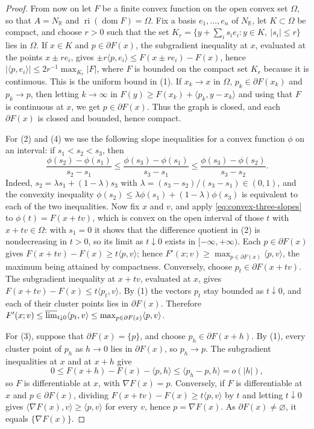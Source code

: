 \begin{proof}
From now on let $F$ be a finite convex function on the open convex set $\Omega$, so that $A=N_{\mathbb R}$ and $\operatorname{ri}(\operatorname{dom}F)=\Omega$. Fix a basis $e_1,\ldots,e_n$ of $N_{\mathbb R}$, let $K\subset\Omega$ be compact, and choose $r>0$ such that the set $K_r=\{y+\sum_is_ie_i:y\in K,\ |s_i|\leq r\}$ lies in $\Omega$. If $x\in K$ and $p\in\partial F(x)$, the subgradient inequality at $x$, evaluated at the points $x\pm re_i$, gives $\pm r\langle p,e_i\rangle\leq F(x\pm re_i)-F(x)$, hence $|\langle p,e_i\rangle|\leq2r^{-1}\max_{K_r}|F|$, where $F$ is bounded on the compact set $K_r$ because it is continuous. This is the uniform bound in (1). If $x_k\to x$ in $\Omega$, $p_k\in\partial F(x_k)$ and $p_k\to p$, then letting $k\to\infty$ in $F(y)\geq F(x_k)+\langle p_k,y-x_k\rangle$ and using that $F$ is continuous at $x$, we get $p\in\partial F(x)$. Thus the graph is closed, and each $\partial F(x)$ is closed and bounded, hence compact.

For (2) and (4) we use the following slope inequalities for a convex function $\phi$ on an interval: if $s_1<s_2<s_3$, then
\begin{equation}\label{eq:convex-three-slopes}
 \frac{\phi(s_2)-\phi(s_1)}{s_2-s_1}\leq\frac{\phi(s_3)-\phi(s_1)}{s_3-s_1}\leq\frac{\phi(s_3)-\phi(s_2)}{s_3-s_2}.
\end{equation}
Indeed, $s_2=\lambda s_1+(1-\lambda)s_3$ with $\lambda=(s_3-s_2)/(s_3-s_1)\in(0,1)$, and the convexity inequality $\phi(s_2)\leq\lambda\phi(s_1)+(1-\lambda)\phi(s_3)$ is equivalent to each of the two inequalities. Now fix $x$ and $v$, and apply \eqref{eq:convex-three-slopes} to $\phi(t)=F(x+tv)$, which is convex on the open interval of those $t$ with $x+tv\in\Omega$: with $s_1=0$ it shows that the difference quotient in (2) is nondecreasing in $t>0$, so its limit as $t\downarrow0$ exists in $[-\infty,+\infty)$. Each $p\in\partial F(x)$ gives $F(x+tv)-F(x)\geq t\langle p,v\rangle$; hence $F'(x;v)\geq\max_{p\in\partial F(x)}\langle p,v\rangle$, the maximum being attained by compactness. Conversely, choose $p_t\in\partial F(x+tv)$. The subgradient inequality at $x+tv$, evaluated at $x$, gives $F(x+tv)-F(x)\leq t\langle p_t,v\rangle$. By (1) the vectors $p_t$ stay bounded as $t\downarrow0$, and each of their cluster points lies in $\partial F(x)$. Therefore $F'(x;v)\leq\varlimsup_{t\downarrow0}\langle p_t,v\rangle\leq\max_{p\in\partial F(x)}\langle p,v\rangle$.

For (3), suppose that $\partial F(x)=\{p\}$, and choose $p_h\in\partial F(x+h)$. By (1), every cluster point of $p_h$ as $h\to0$ lies in $\partial F(x)$, so $p_h\to p$. The subgradient inequalities at $x$ and at $x+h$ give
\[
 0\leq F(x+h)-F(x)-\langle p,h\rangle\leq\langle p_h-p,h\rangle=o(|h|),
\]
so $F$ is differentiable at $x$, with $\nabla F(x)=p$. Conversely, if $F$ is differentiable at $x$ and $p\in\partial F(x)$, dividing $F(x+tv)-F(x)\geq t\langle p,v\rangle$ by $t$ and letting $t\downarrow0$ gives $\langle\nabla F(x),v\rangle\geq\langle p,v\rangle$ for every $v$, hence $p=\nabla F(x)$. As $\partial F(x)\neq\varnothing$, it equals $\{\nabla F(x)\}$.


\end{proof}

